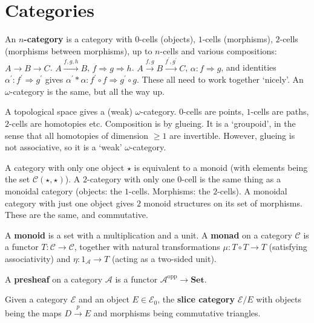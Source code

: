 \documentclass{amsbook}
\newcommand{\Catc}[1]{\mathcal{#1}}
\newcommand{\CC}{\Catc{C}}
\newcommand{\EE}{\Catc{E}}
\newcommand{\Ob}[1]{{#1}_0}
\newcommand{\Hom}[3]{{#1}\left(#2,#3\right)}
\theoremstyle{definition}
\begin{document}
  \section{Categories}
  An \textbf{$ n $-category} is a category with $ 0 $-cells (objects), $ 1 $-cells (morphisms), $ 2 $-cells (morphisms between morphisms), up to $ n $-cells and various compositions: $ A \to B \to C $. $ A \xrightarrow{f, g, h} B $, $ f \Rightarrow g \Rightarrow h $. $ A \xrightarrow{f, g} B \xrightarrow{f^\prime, g^\prime} C $, $ \alpha: f \Rightarrow g $, and identities $ \alpha^\prime: f^\prime \Rightarrow g^\prime $ gives $ \alpha^\prime * \alpha: f^\prime \circ f \Rightarrow g^\prime \circ g $. These all need to work together `nicely'. An $ \omega $-category is the same, but all the way up.

  A topological space gives a (weak) $ \omega $-category. $ 0 $-cells are points, $ 1 $-cells are paths, $ 2 $-cells are homotopies etc. Composition is by glueing. It is a `groupoid', in the sense that all homotopies of dimension $ \geq 1 $ are invertible. However, glueing is not associative, so it is a `weak' $ \omega $-category.

  A category with only one object $ \star $ is equivalent to a monoid (with elements being the set $ \Hom{\CC}{\star}{\star} $). A $ 2 $-category with only one $ 0 $-cell is the same thing as a monoidal category (objects: the $ 1 $-cells. Morphisms: the $ 2 $-cells). A monoidal category with just one object gives $ 2 $ monoid structures on its set of morphisms. These are the same, and commutative.

  A \textbf{monoid} is a set with a multiplication and a unit. A \textbf{monad} on a category $ \CC $ is a functor $ T: \CC \to \CC $, together with natural transformations $ \mu : T \circ T \to T $ (satisfying associativity) and $ \eta : 1_{\mathcal A} \to T $ (acting as a two-sided unit).

  A \textbf{presheaf} on a category $ \mathcal A $ is a functor $ \mathcal A^{\mathop{opp}} \to \mathbf{Set} $.

  Given a category $ \mathcal E $ and an object $ E \in \Ob \EE $, the \textbf{slice category} $ \mathcal E / E $ with objects being the maps $ D \xrightarrow{p} E $ and morphisms being commutative triangles.
\end{document}
